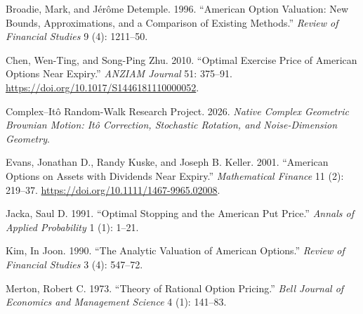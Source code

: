 \documentclass[
  english,
  10pt,
  letterpaper,
  DIV=11,
  numbers=noendperiod]{scrartcl}
\newlength{\cslhangindent}
\newenvironment{CSLReferences}[2] %
 {\begin{list}{}{%
  \setlength{\itemindent}{0pt}
  \setlength{\leftmargin}{0pt}
  \setlength{\parsep}{0pt}
  \ifodd #1
   \setlength{\leftmargin}{\cslhangindent}
   \setlength{\itemindent}{-1\cslhangindent}
  \fi
  \setlength{\itemsep}{#2\baselineskip}}}
 {\end{list}}
\begin{document}
\protect{}\label{refs}
\begin{CSLReferences}{1}{1}
Broadie, Mark, and Jérôme Detemple. 1996. {``{A}merican Option
Valuation: New Bounds, Approximations, and a Comparison of Existing
Methods.''} \emph{Review of Financial Studies} 9 (4): 1211--50.

Chen, Wen-Ting, and Song-Ping Zhu. 2010. {``Optimal Exercise Price of
{A}merican Options Near Expiry.''} \emph{ANZIAM Journal} 51: 375--91.
\url{https://doi.org/10.1017/S1446181110000052}.

Complex--Itô Random-Walk Research Project. 2026. \emph{Native Complex
Geometric Brownian Motion: Itô Correction, Stochastic Rotation, and
Noise-Dimension Geometry}.

Evans, Jonathan D., Randy Kuske, and Joseph B. Keller. 2001.
{``{A}merican Options on Assets with Dividends Near Expiry.''}
\emph{Mathematical Finance} 11 (2): 219--37.
\url{https://doi.org/10.1111/1467-9965.02008}.

Jacka, Saul D. 1991. {``Optimal Stopping and the {A}merican Put
Price.''} \emph{Annals of Applied Probability} 1 (1): 1--21.

Kim, In Joon. 1990. {``The Analytic Valuation of American Options.''}
\emph{Review of Financial Studies} 3 (4): 547--72.

Merton, Robert C. 1973. {``Theory of Rational Option Pricing.''}
\emph{Bell Journal of Economics and Management Science} 4 (1): 141--83.

\end{CSLReferences}
\end{document}
